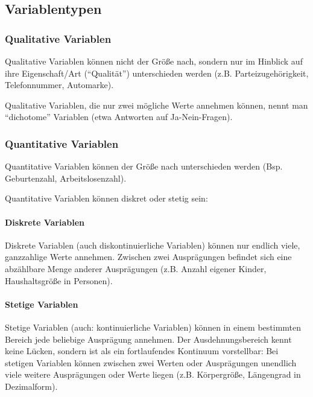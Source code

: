 \documentclass[
  11pt,
  ngerman,
  a4paper,
]{report}
\begin{document}
\hypertarget{variablentypen}{%
\subsection{Variablentypen}\label{variablentypen}}

\nopagebreak

\hypertarget{qualitative-variablen}{%
\subsubsection{Qualitative Variablen}\label{qualitative-variablen}}

Qualitative Variablen können nicht der Größe nach, sondern nur im Hinblick auf ihre Eigenschaft/Art (\enquote{Qualität}) unterschieden werden (z.B. Parteizugehörigkeit, Telefonnummer, Automarke).

Qualitative Variablen, die nur zwei mögliche Werte annehmen können, nennt man \enquote{dichotome} Variablen (etwa Antworten auf Ja-Nein-Fragen).

\hypertarget{quantitative-variablen}{%
\subsubsection{Quantitative Variablen}\label{quantitative-variablen}}

Quantitative Variablen können der Größe nach unterschieden werden (Bsp. Geburtenzahl, Arbeitslosenzahl).

Quantitative Variablen können diskret oder stetig sein:

\hypertarget{diskrete-variablen}{%
\paragraph{Diskrete Variablen}\label{diskrete-variablen}}

Diskrete Variablen (auch diskontinuierliche Variablen) können nur endlich viele, ganzzahlige Werte annehmen. Zwischen zwei Ausprägungen befindet sich eine abzählbare Menge anderer Ausprägungen (z.B. Anzahl eigener Kinder, Haushaltsgröße in Personen).

\hypertarget{stetige-variablen}{%
\paragraph{Stetige Variablen}\label{stetige-variablen}}

Stetige Variablen (auch: kontinuierliche Variablen) können in einem bestimmten Bereich jede beliebige Ausprägung annehmen. Der Ausdehnungsbereich kennt keine Lücken, sondern ist als ein fortlaufendes Kontinuum vorstellbar: Bei stetigen Variablen können zwischen zwei Werten oder Ausprägungen unendlich viele weitere Ausprägungen oder Werte liegen (z.B. Körpergröße, Längengrad in Dezimalform).
\end{document}
